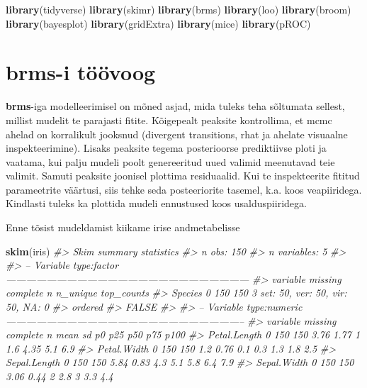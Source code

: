 \documentclass[]{book}
\newenvironment{Shaded}{\begin{snugshade}}{\end{snugshade}}
\newcommand{\CommentTok}[1]{\textcolor[rgb]{0.56,0.35,0.01}{\textit{#1}}}
\newcommand{\KeywordTok}[1]{\textcolor[rgb]{0.13,0.29,0.53}{\textbf{#1}}}
\newcommand{\NormalTok}[1]{#1}
\begin{document}
\begin{Shaded}
\begin{Highlighting}[]
\KeywordTok{library}\NormalTok{(tidyverse)}
\KeywordTok{library}\NormalTok{(skimr)}
\KeywordTok{library}\NormalTok{(brms)}
\KeywordTok{library}\NormalTok{(loo)}
\KeywordTok{library}\NormalTok{(broom)}
\KeywordTok{library}\NormalTok{(bayesplot)}
\KeywordTok{library}\NormalTok{(gridExtra)}
\KeywordTok{library}\NormalTok{(mice)}
\KeywordTok{library}\NormalTok{(pROC)}
\end{Highlighting}
\end{Shaded}

\hypertarget{brms-i-toovoog}{%
\section{brms-i töövoog}\label{brms-i-toovoog}}

\textbf{brms}-iga modelleerimisel on mõned asjad, mida tuleks teha sõltumata sellest, millist mudelit te parajasti fitite. Kõigepealt peaksite kontrollima, et mcmc ahelad on korralikult jooksnud (divergent transitions, rhat ja ahelate visuaalne inspekteerimine). Lisaks peaksite tegema posterioorse prediktiivse ploti ja vaatama, kui palju mudeli poolt genereeritud uued valimid meenutavad teie valimit. Samuti peaksite joonisel plottima residuaalid. Kui te inspekteerite fititud parameetrite väärtusi, siis tehke seda posteeriorite tasemel, k.a. koos veapiiridega. Kindlasti tuleks ka plottida mudeli ennustused koos usalduspiiridega.

Enne tõsist mudeldamist kiikame irise andmetabelisse

\begin{Shaded}
\begin{Highlighting}[]
\KeywordTok{skim}\NormalTok{(iris)}
\CommentTok{#> Skim summary statistics}
\CommentTok{#>  n obs: 150 }
\CommentTok{#>  n variables: 5 }
\CommentTok{#> }
\CommentTok{#> -- Variable type:factor ------------------------------------------------------------------------}
\CommentTok{#>  variable missing complete   n n_unique                       top_counts}
\CommentTok{#>   Species       0      150 150        3 set: 50, ver: 50, vir: 50, NA: 0}
\CommentTok{#>  ordered}
\CommentTok{#>    FALSE}
\CommentTok{#> }
\CommentTok{#> -- Variable type:numeric -----------------------------------------------------------------------}
\CommentTok{#>      variable missing complete   n mean   sd  p0 p25  p50 p75 p100}
\CommentTok{#>  Petal.Length       0      150 150 3.76 1.77 1   1.6 4.35 5.1  6.9}
\CommentTok{#>   Petal.Width       0      150 150 1.2  0.76 0.1 0.3 1.3  1.8  2.5}
\CommentTok{#>  Sepal.Length       0      150 150 5.84 0.83 4.3 5.1 5.8  6.4  7.9}
\CommentTok{#>   Sepal.Width       0      150 150 3.06 0.44 2   2.8 3    3.3  4.4}
\end{Highlighting}
\end{Shaded}
\end{document}
